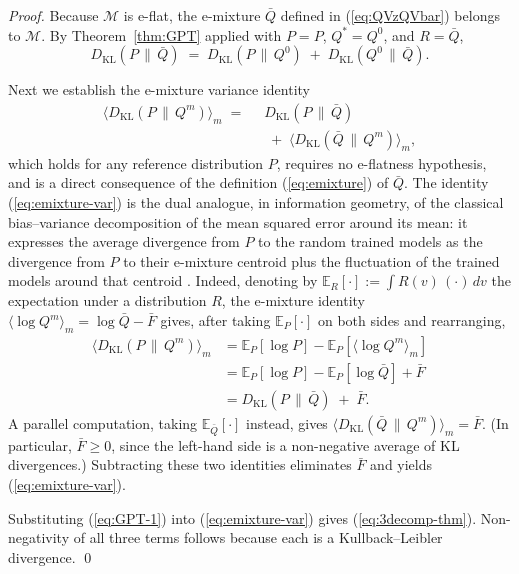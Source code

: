 \documentclass[11pt,a4paper]{article}
\theoremstyle{definition}
\theoremstyle{remark}
\newcommand{\KL}{D_{\mathrm{KL}}}
\newcommand{\E}{\mathbb{E}}
\newcommand{\PV}{P}
\newcommand{\QVz}{Q^{0}}
\newcommand{\QVm}{Q^{m}}
\newcommand{\QVbar}{\bar{Q}}
\newcommand{\Mfam}{\mathcal{M}}
\begin{document}
\begin{proof}
Because $\Mfam$ is e-flat, the e-mixture $\QVbar$ defined in
(\ref{eq:QVzQVbar}) belongs to $\Mfam$. By
Theorem~\ref{thm:GPT} applied with $P = \PV$, $Q^{*} = \QVz$, and
$R = \QVbar$,
\begin{equation}
  \KL(\PV \,\|\, \QVbar)
  \;=\;
  \KL(\PV \,\|\, \QVz)
  \;+\;
  \KL(\QVz \,\|\, \QVbar) .
  \label{eq:GPT-1}
\end{equation}

Next we establish the e-mixture variance identity
\begin{align}
  \big\langle \KL(\PV \,\|\, \QVm) \big\rangle_{m}
  \;=\;\;
  & \KL(\PV \,\|\, \QVbar)
  \nonumber \\
  & \;+\;
  \big\langle \KL(\QVbar \,\|\, \QVm) \big\rangle_{m} ,
  \label{eq:emixture-var}
\end{align}
which holds for any reference distribution $\PV$, requires no
e-flatness hypothesis, and is a direct consequence of the
definition (\ref{eq:emixture}) of $\QVbar$.
The identity (\ref{eq:emixture-var}) is the dual analogue, in
information geometry, of the classical bias--variance decomposition
of the mean squared error around its mean: it expresses the average
divergence from $\PV$ to the random trained models as the
divergence from $\PV$ to their e-mixture centroid plus the
fluctuation of the trained models around that centroid
\cite[\S 2.6 and \S 3.6]{Amari2016}.
Indeed, denoting by $\E_R[\cdot] := \int R(v)\,(\cdot)\,dv$ the
expectation under a distribution $R$, the e-mixture identity
$\langle\log\QVm\rangle_{m} = \log\QVbar - \bar F$ gives, after
taking $\E_{\PV}[\cdot]$ on both sides and rearranging,
\begin{align*}
  \big\langle \KL(\PV \,\|\, \QVm) \big\rangle_{m}
  &= \E_{\PV}\!\left[\log\PV\right]
     - \E_{\PV}\!\left[\langle\log\QVm\rangle_{m}\right]
  \\
  &= \E_{\PV}\!\left[\log\PV\right]
     - \E_{\PV}\!\left[\log\QVbar\right] + \bar F
  \\
  &= \KL(\PV \,\|\, \QVbar) \;+\; \bar F .
\end{align*}
A parallel computation, taking $\E_{\QVbar}[\cdot]$ instead, gives
$\langle \KL(\QVbar \,\|\, \QVm) \rangle_{m} = \bar F$.
(In particular, $\bar F \geq 0$, since the left-hand side is a
non-negative average of KL divergences.) Subtracting these two
identities eliminates $\bar F$ and yields (\ref{eq:emixture-var}).

Substituting (\ref{eq:GPT-1}) into (\ref{eq:emixture-var}) gives
(\ref{eq:3decomp-thm}). Non-negativity of all three terms follows
because each is a Kullback--Leibler divergence.
\qed
\end{proof}
\end{document}
